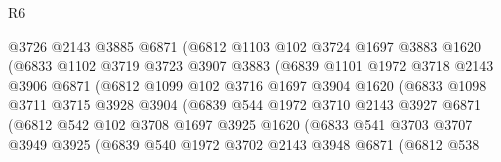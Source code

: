 \begin{lexlean}{R6}
\begin{coremodule}
                        @3726
                        @2143
                        @3885
                        @6871
                        (@6812
                          @1103
                          @102
                          @3724
                          @1697
                          @3883
                          @1620
                          (@6833
                            @1102
                            @3719
                            @3723
                            @3907
                            @3883
                            (@6839
                              @1101
                              @1972
                              @3718
                              @2143
                              @3906
                              @6871
                              (@6812
                                @1099
                                @102
                                @3716
                                @1697
                                @3904
                                @1620
                                (@6833
                                  @1098
                                  @3711
                                  @3715
                                  @3928
                                  @3904
                                  (@6839
                                    @544
                                    @1972
                                    @3710
                                    @2143
                                    @3927
                                    @6871
                                    (@6812
                                      @542
                                      @102
                                      @3708
                                      @1697
                                      @3925
                                      @1620
                                      (@6833
                                        @541
                                        @3703
                                        @3707
                                        @3949
                                        @3925
                                        (@6839
                                          @540
                                          @1972
                                          @3702
                                          @2143
                                          @3948
                                          @6871
                                          (@6812
                                            @538

\end{coremodule}
\end{lexlean}
